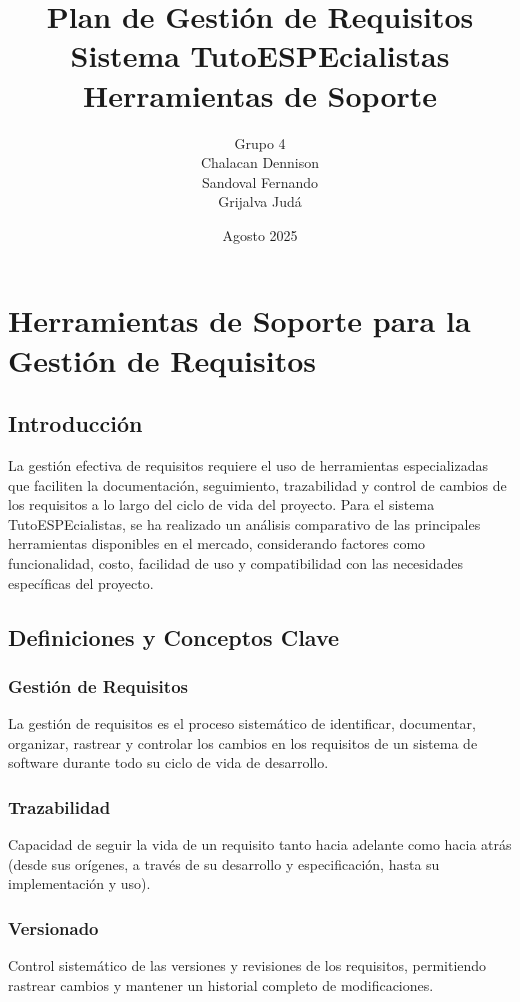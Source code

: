 \documentclass[12pt,a4paper]{article}
\title{\textbf{Plan de Gestión de Requisitos\\Sistema TutoESPEcialistas\\Herramientas de Soporte}}
\author{Grupo 4\\Chalacan Dennison\\Sandoval Fernando\\Grijalva Judá}
\date{Agosto 2025}
\begin{document}
\maketitle
\newpage

\tableofcontents
\newpage

\section{Herramientas de Soporte para la Gestión de Requisitos}

\subsection{Introducción}

La gestión efectiva de requisitos requiere el uso de herramientas especializadas que faciliten la documentación, seguimiento, trazabilidad y control de cambios de los requisitos a lo largo del ciclo de vida del proyecto. Para el sistema TutoESPEcialistas, se ha realizado un análisis comparativo de las principales herramientas disponibles en el mercado, considerando factores como funcionalidad, costo, facilidad de uso y compatibilidad con las necesidades específicas del proyecto.

\subsection{Definiciones y Conceptos Clave}

\subsubsection{Gestión de Requisitos}
La gestión de requisitos es el proceso sistemático de identificar, documentar, organizar, rastrear y controlar los cambios en los requisitos de un sistema de software durante todo su ciclo de vida de desarrollo.

\subsubsection{Trazabilidad}
Capacidad de seguir la vida de un requisito tanto hacia adelante como hacia atrás (desde sus orígenes, a través de su desarrollo y especificación, hasta su implementación y uso).

\subsubsection{Versionado}
Control sistemático de las versiones y revisiones de los requisitos, permitiendo rastrear cambios y mantener un historial completo de modificaciones.
\end{document}
